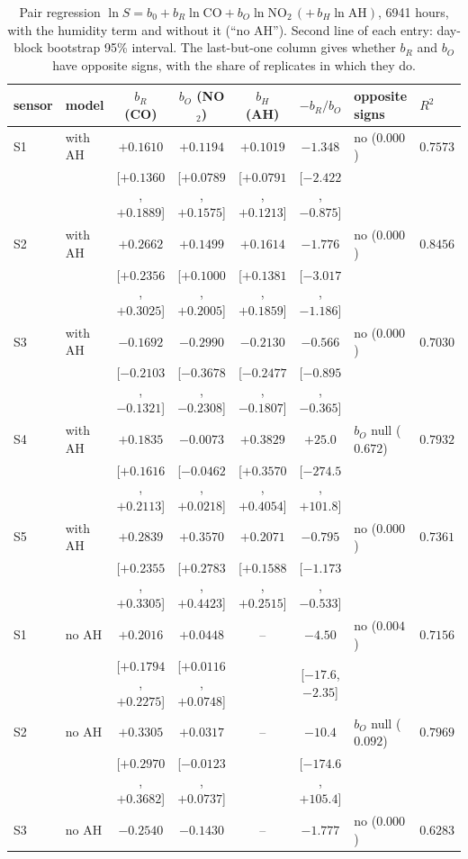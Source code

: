 \documentclass[11pt]{article}
\theoremstyle{definition}\newtheorem{definition}[theorem]{Definition}
\theoremstyle{remark}\newtheorem{remark}[theorem]{Remark}
\begin{document}
\begin{table}[htbp]\centering
\caption{Pair regression $\ln S=b_0+b_R\ln\mathrm{CO}+b_O\ln\mathrm{NO_2}\,(+\,b_H\ln\mathrm{AH})$, 6941 hours, with the humidity term and without it (``no AH''). Second line of each entry: day-block bootstrap 95\% interval. The last-but-one column gives whether $b_R$ and $b_O$ have opposite signs, with the share of replicates in which they do.}\label{tab:pairreg}
\scriptsize\setlength{\tabcolsep}{3pt}
\begin{tabular}{@{}llccccll@{}}\toprule
sensor & model & $b_R$ (CO) & $b_O$ (NO$_2$) & $b_H$ (AH) & $-b_R/b_O$ & opposite signs & $R^2$\\\midrule
S1 & with AH & $+0.1610$ & $+0.1194$ & $+0.1019$ & $-1.348$ & no ($0.000$) & $0.7573$\\
 & & [$+0.1360$, $+0.1889$] & [$+0.0789$, $+0.1575$] & [$+0.0791$, $+0.1213$] & [$-2.422$, $-0.875$] & & \\
S2 & with AH & $+0.2662$ & $+0.1499$ & $+0.1614$ & $-1.776$ & no ($0.000$) & $0.8456$\\
 & & [$+0.2356$, $+0.3025$] & [$+0.1000$, $+0.2005$] & [$+0.1381$, $+0.1859$] & [$-3.017$, $-1.186$] & & \\
S3 & with AH & $-0.1692$ & $-0.2990$ & $-0.2130$ & $-0.566$ & no ($0.000$) & $0.7030$\\
 & & [$-0.2103$, $-0.1321$] & [$-0.3678$, $-0.2308$] & [$-0.2477$, $-0.1807$] & [$-0.895$, $-0.365$] & & \\
S4 & with AH & $+0.1835$ & $-0.0073$ & $+0.3829$ & $+25.0$ & $b_O$ null ($0.672$) & $0.7932$\\
 & & [$+0.1616$, $+0.2113$] & [$-0.0462$, $+0.0218$] & [$+0.3570$, $+0.4054$] & [$-274.5$, $+101.8$] & & \\
S5 & with AH & $+0.2839$ & $+0.3570$ & $+0.2071$ & $-0.795$ & no ($0.000$) & $0.7361$\\
 & & [$+0.2355$, $+0.3305$] & [$+0.2783$, $+0.4423$] & [$+0.1588$, $+0.2515$] & [$-1.173$, $-0.533$] & & \\
S1 & no AH & $+0.2016$ & $+0.0448$ & -- & $-4.50$ & no ($0.004$) & $0.7156$\\
 & & [$+0.1794$, $+0.2275$] & [$+0.0116$, $+0.0748$] & & [$-17.6$, $-2.35$] & & \\
S2 & no AH & $+0.3305$ & $+0.0317$ & -- & $-10.4$ & $b_O$ null ($0.092$) & $0.7969$\\
 & & [$+0.2970$, $+0.3682$] & [$-0.0123$, $+0.0737$] & & [$-174.6$, $+105.4$] & & \\
S3 & no AH & $-0.2540$ & $-0.1430$ & -- & $-1.777$ & no ($0.000$) & $0.6283$\\

\end{tabular}
\end{table}
\end{document}
